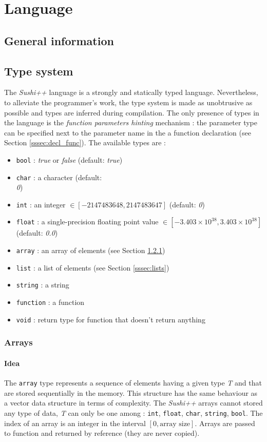 \documentclass[a4paper,11pt]{article}
\begin{document}
\section{Language}
\label{sec:language}
\subsection{General information}
\subsection{Type system}
\label{ssec:types_s}
The \textit{Sushi++} language is a strongly and statically typed language. Nevertheless, to alleviate the programmer's work, the type system is made as unobtrusive as possible and types are inferred during compilation. The only presence of types in the language is the \textit{function parameters hinting} mechanism : the parameter type can be specified next to the parameter name in the a function declaration (see Section \ref{sssec:decl_func}). The available types are :

\begin{itemize}
	\item \texttt{bool} : \textit{true} or \textit{false} (default: \textit{true})
	\item \texttt{char} : a character (default: \textit{\\0})
	\item \texttt{int} : an integer $\in [-2147483648, 2147483647]$ (default: \textit{0})
	\item \texttt{float} : a single-precision floating point value $\in [-3.403 \times 10^{38},  3.403 \times 10^{38}] $ (default: \textit{0.0})
	\item \texttt{array} : an array of elements (see Section \ref{sssec:arrays})
	\item \texttt{list} : a list of elements (see Section \ref{sssec:lists})
	\item \texttt{string} : a string
	\item \texttt{function} : a function 
	\item \texttt{void} : return type for function that doesn't return anything
\end{itemize}
\subsubsection{Arrays}
\label{sssec:arrays}
\paragraph{Idea}
The \texttt{array} type represents a sequence of elements having a given type \textit{T} and that are stored sequentially in the memory. This structure has the same behaviour as a vector data structure in terms of complexity. The \textit{Sushi++} arrays cannot stored any type of data, \textit{T} can only be one among : \texttt{int}, \texttt{float}, \texttt{char}, \texttt{string}, \texttt{bool}. The index of an array is an integer in the interval $[0, \text{array size}]$. Arrays are passed to function and returned by reference (they are never copied).
\end{document}
